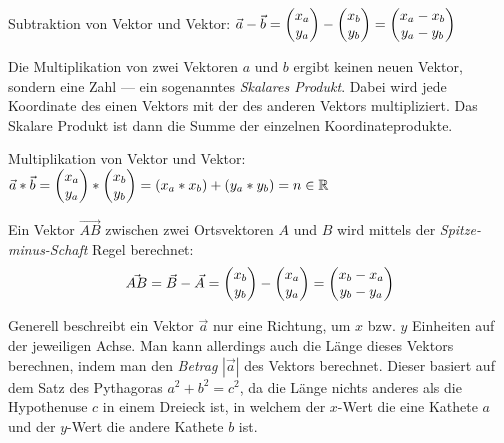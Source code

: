 Subtraktion von Vektor und Vektor: $\vec{a} - \vec{b} = \begin{pmatrix}x_{a}\\y_{a}\end{pmatrix} - \begin{pmatrix}x_{b}\\y_{b}\end{pmatrix} = \begin{pmatrix}x_{a} - x_{b} \\ y_{a} - y_{b}\end{pmatrix}$

Die Multiplikation von zwei Vektoren $a$ und $b$ ergibt keinen neuen Vektor, sondern eine Zahl --- ein sogenanntes \emph{Skalares Produkt}. Dabei wird jede Koordinate des einen Vektors mit der des anderen Vektors multipliziert. Das Skalare Produkt ist dann die Summe der einzelnen Koordinateprodukte.

Multiplikation von Vektor und Vektor: $\vec{a} * \vec{b} = \begin{pmatrix}x_{a} \\ y_{a}\end{pmatrix} * \begin{pmatrix}x_{b} \\ y_{b}\end{pmatrix} = (x_{a} * x_{b}) + (y_{a} * y_{b}) = n \in \mathbb{R}$

\pagebreak



Ein Vektor $\vec{AB}$ zwischen zwei Ortsvektoren $A$ und $B$ wird mittels der \emph{Spitze-minus-Schaft} Regel berechnet:
$$ \vec{AB} = \vec{B} - \vec{A} = \begin{pmatrix}x_{b}\\y_{b}\end{pmatrix} - \begin{pmatrix}x_{a}\\y_{a}\end{pmatrix} = \begin{pmatrix}x_{b}-x_{a}\\y_{b}-y_{a}\end{pmatrix}$$


Generell beschreibt ein Vektor $\vec{a}$ nur eine Richtung, um $x$ bzw. $y$ Einheiten auf der jeweiligen Achse. Man kann allerdings auch die L\"{a}nge dieses Vektors berechnen, indem man den \emph{Betrag} $|\vec{a}|$ des Vektors berechnet. Dieser basiert auf dem Satz des Pythagoras $a^2 + b^2 = c^2$, da die L\"{a}nge nichts anderes als die Hypothenuse $c$ in einem Dreieck ist, in welchem der $x$-Wert die eine Kathete $a$ und der $y$-Wert die andere Kathete $b$ ist.

\begin{figure}[h!]
  \centering
  \large
\end{figure}

